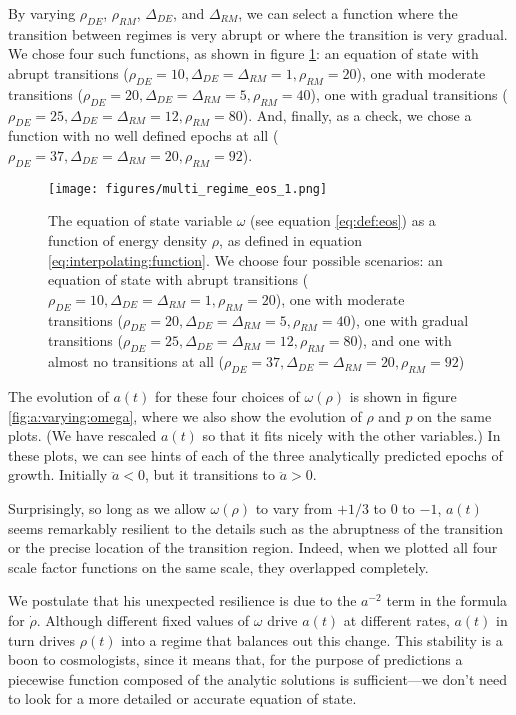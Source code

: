 \documentclass[]{article}
\begin{document}
By varying $\rho_{DE}$, $\rho_{RM}$, $\Delta_{DE}$, and $\Delta_{RM}$,
we can select a function where the transition between regimes is very
abrupt or where the transition is very gradual. We chose four such
functions, as shown in figure \ref{fig:omega:of:rho}: an equation of
state with abrupt transitions
($\rho_{DE}=10,\Delta_{DE}=\Delta_{RM}=1,\rho_{RM}=20$), one with
moderate transitions
($\rho_{DE}=20,\Delta_{DE}=\Delta_{RM}=5,\rho_{RM}=40$), one with
gradual transitions
($\rho_{DE}=25,\Delta_{DE}=\Delta_{RM}=12,\rho_{RM}=80$). And,
finally, as a check, we chose a function with no well defined epochs
at all ($\rho_{DE}=37,\Delta_{DE}=\Delta_{RM}=20,\rho_{RM}=92$).

\begin{figure}[tbh]
  \begin{center}
    \leavevmode
    \texttt{[image: figures/multi\_regime\_eos\_1.png]}
    \caption[EOS]{The equation of state variable $\omega$ (see
      equation \eqref{eq:def:eos}) as a function of energy density
      $\rho$, as defined in equation
      \eqref{eq:interpolating:function}. We choose four possible
      scenarios: an equation of state with abrupt transitions
      ($\rho_{DE}=10,\Delta_{DE}=\Delta_{RM}=1,\rho_{RM}=20$), one
      with moderate transitions
      ($\rho_{DE}=20,\Delta_{DE}=\Delta_{RM}=5,\rho_{RM}=40$), one
      with gradual transitions
      ($\rho_{DE}=25,\Delta_{DE}=\Delta_{RM}=12,\rho_{RM}=80$), and
      one with almost no transitions at all
      ($\rho_{DE}=37,\Delta_{DE}=\Delta_{RM}=20,\rho_{RM}=92$)}
    \label{fig:omega:of:rho}
  \end{center}
\end{figure}

The evolution of $a(t)$ for these four choices of $\omega(\rho)$ is
shown in figure \ref{fig:a:varying:omega}, where we also show the
evolution of $\rho$ and $p$ on the same plots. (We have rescaled
$a(t)$ so that it fits nicely with the other variables.) In these
plots, we can see hints of each of the three analytically predicted
epochs of growth. Initially $\ddot{a} < 0$, but it transitions to
$\ddot{a}>0$.

Surprisingly, so long as we allow $\omega(\rho)$ to
vary from $+1/3$ to $0$ to $-1$, $a(t)$ seems remarkably resilient to
the details such as the abruptness of the transition or the precise
location of the transition region. Indeed, when we plotted all four
scale factor functions on the same scale, they overlapped completely.

We postulate that his unexpected resilience is due to the $a^{-2}$
term in the formula for $\dot{\rho}$. Although different fixed values
of $\omega$ drive $a(t)$ at different rates, $a(t)$ in turn drives
$\rho(t)$ into a regime that balances out this change. This stability
is a boon to cosmologists, since it means that, for the purpose of
predictions a piecewise function composed of the analytic solutions is
sufficient---we don't need to look for a more detailed or accurate
equation of state.
\end{document}
